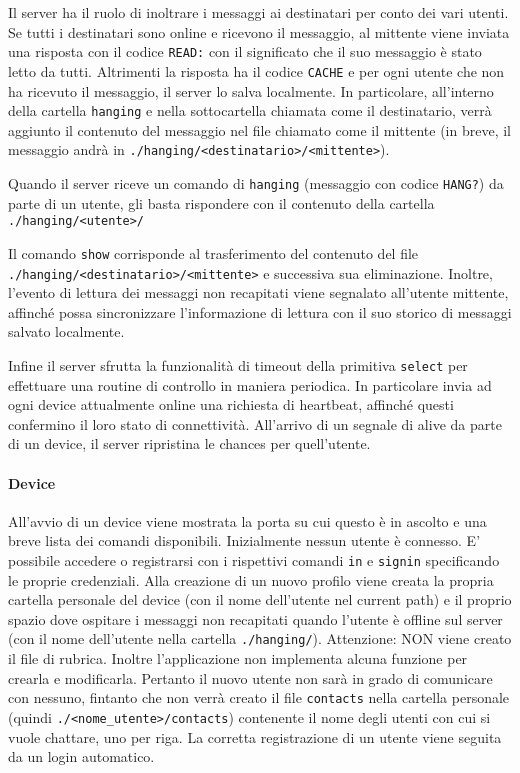 \documentclass[11pt,a4paper,twocolumn,twoside]{paper}
\begin{document}
    Il server ha il ruolo di inoltrare i messaggi ai destinatari per
    conto dei vari utenti. Se tutti i destinatari sono online e ricevono
    il messaggio, al mittente viene inviata una risposta con il codice
    \texttt{READ:} con il significato che il suo messaggio è stato
    letto da tutti. Altrimenti la risposta ha il codice \texttt{CACHE} e
    per ogni utente che non ha ricevuto il messaggio, il server lo salva
    localmente. In particolare, all'interno della cartella
    \texttt{hanging} e nella sottocartella chiamata come il
    destinatario, verrà aggiunto il contenuto del messaggio nel
    file chiamato come il mittente (in breve, il messaggio andrà in
    \texttt{./hanging/\textless{}destinatario\textgreater{}/\textless{}mittente\textgreater{}}).

    Quando il server riceve un comando di \texttt{hanging} (messaggio
    con codice \texttt{HANG?}) da parte di un utente, gli basta
    rispondere con il contenuto della cartella
    \texttt{./hanging/\textless{}utente\textgreater{}/}

    Il comando \texttt{show} corrisponde al trasferimento del contenuto
    del file
    \texttt{./hanging/\textless{}destinatario\textgreater{}/\textless{}mittente\textgreater{}}
    e successiva sua eliminazione. Inoltre, l'evento di lettura dei
    messaggi non recapitati viene segnalato all'utente mittente,
    affinché possa sincronizzare l'informazione di lettura con il suo
    storico di messaggi salvato localmente.

    Infine il server sfrutta la funzionalità di timeout della primitiva
    \texttt{select} per effettuare una routine di controllo in maniera
    periodica. In particolare invia ad ogni device attualmente online
    una richiesta di heartbeat, affinché questi confermino il loro stato
    di connettività. All'arrivo di un segnale di alive da parte di un
    device, il server ripristina le chances per quell'utente.
\paragraph{Device}
	All'avvio di un device viene mostrata la porta su cui questo è in
    ascolto e una breve lista dei comandi disponibili. Inizialmente
    nessun utente è connesso. E' possibile accedere o registrarsi con i
    rispettivi comandi \texttt{in} e \texttt{signin} specificando le
    proprie credenziali. Alla creazione di un nuovo profilo viene creata
    la propria cartella personale del device (con il nome dell'utente
    nel current path) e il proprio spazio dove ospitare i messaggi non
    recapitati quando l'utente è offline sul server (con il nome
    dell'utente nella cartella \texttt{./hanging/}). Attenzione: NON
    viene creato il file di rubrica. Inoltre l'applicazione non
    implementa alcuna funzione per crearla e modificarla. Pertanto il
    nuovo utente non sarà in grado di comunicare con nessuno, fintanto
    che non verrà creato il file \texttt{contacts} nella cartella
    personale (quindi
    \texttt{./\textless{}nome\_utente\textgreater{}/contacts})
    contenente il nome degli utenti con cui si vuole chattare, uno per
    riga. La corretta registrazione di un utente viene seguita da un
    login automatico.
\end{document}
